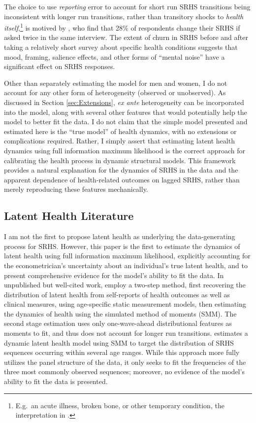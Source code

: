 \documentclass[12pt,pdftex,letterpaper]{article}
\begin{document}
The choice to use \textit{reporting} error to account for short run SRHS transitions being inconsistent with longer run transitions, rather than transitory shocks to \textit{health itself},\footnote{E.g.\ an acute illness, broken bone, or other temporary condition, the interpretation in \cite{Halliday11}.} is motived by \cite{Crossley02}, who find that 28\% of respondents change their SRHS if asked twice in the same interview.  The extent of churn in SRHS before and after taking a relatively short survey about specific health conditions suggests that mood, framing, salience effects, and other forms of ``mental noise'' have a significant effect on SRHS responses.

Other than separately estimating the model for men and women, I do not account for any other form of heterogeneity (observed or unobserved).  As discussed in Section \ref{sec:Extensions}, \textit{ex ante} heterogeneity can be incorporated into the model, along with several other features that would potentially help the model to better fit the data.  I do not claim that the simple model presented and estimated here is the ``true model'' of health dynamics, with no extensions or complications required.  Rather, I simply assert that estimating latent health dynamics using full information maximum likelihood is the correct approach for calibrating the health process in dynamic structural models.  This framework provides a natural explanation for the dynamics of SRHS in the data and the apparent dependence of health-related outcomes on lagged SRHS, rather than merely reproducing these features mechanically.


\subsection{Latent Health Literature}\label{sec:Lit}

I am not the first to propose latent health as underlying the data-generating process for SRHS. However, this paper is the first to estimate the dynamics of latent health using full information maximum likelihood, explicitly accounting for the econometrician's uncertainty about an individual's true latent health, and to present comprehensive evidence for the model's ability to fit the data.  In unpublished but well-cited work, \cite{Lange12} employ a two-step method, first recovering the distribution of latent health from self-reports of health outcomes as well as clinical measures, using age-specific static measurement models, then estimating the dynamics of health using the simulated method of moments (SMM).  The second stage estimation uses only one-wave-ahead distributional features as moments to fit, and thus does not account for longer run transitions.  \cite{Halliday11} estimates a dynamic latent health model using SMM to target the distribution of SRHS sequences occurring within several age ranges.  While this approach more fully utilizes the panel structure of the data, it only seeks to fit the frequencies of the three most commonly observed sequences; moreover, no evidence of the model's ability to fit the data is presented.
\end{document}
